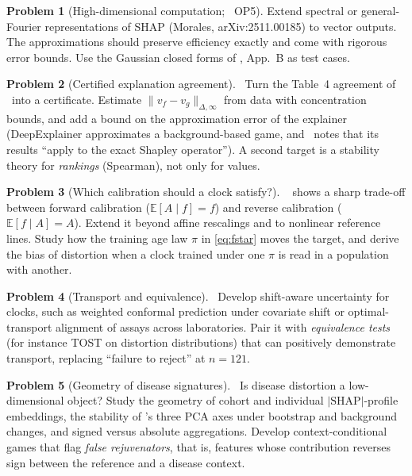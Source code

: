 \documentclass[11pt,a4paper]{article}
\theoremstyle{plain}
\theoremstyle{definition}
\newtheorem{problem}{Problem}
\theoremstyle{remark}
\newcommand{\tagbox}[2]{\tcbox[on line,boxsep=1pt,left=2pt,right=2pt,top=0pt,bottom=0pt,
  colback=#1!12!white,colframe=#1,boxrule=0.4pt,arc=1pt]{\scriptsize\bfseries\color{#1}#2}}
\newcommand{\PROP}{\tagbox{ochre}{PROPOSAL}}
\newcommand{\E}{\mathbb{E}}
\begin{document}
\begin{problem}[High-dimensional computation; \PII\ OP5]\label{prob:highdim}
Extend spectral or general-Fourier representations of SHAP (Morales, arXiv:2511.00185) to vector outputs. The approximations should preserve efficiency exactly and come with rigorous error bounds. Use the Gaussian closed forms of \PII, App.~B as test cases.
\end{problem}

\begin{problem}[Certified explanation agreement]\label{prob:certificate}
\PROP\ Turn the Table~4 agreement of \PII\ into a certificate. Estimate $\|v_f-v_g\|_{\Delta,\infty}$ from data with concentration bounds, and add a bound on the approximation error of the explainer (DeepExplainer approximates a background-based game, and \PII\ notes that its results ``apply to the exact Shapley operator''). A second target is a stability theory for \emph{rankings} (Spearman), not only for values.
\end{problem}

\begin{problem}[Which calibration should a clock satisfy?]\label{prob:calibration}
\PROP\  shows a sharp trade-off between forward calibration ($\E[A\mid f]=f$) and reverse calibration ($\E[f\mid A]=A$). Extend it beyond affine rescalings and to nonlinear reference lines. Study how the training age law $\pi$ in \eqref{eq:fstar} moves the target, and derive the bias of distortion when a clock trained under one $\pi$ is read in a population with another.
\end{problem}

\begin{problem}[Transport and equivalence]\label{prob:transport}
\PROP\ Develop shift-aware uncertainty for clocks, such as weighted conformal prediction under covariate shift or optimal-transport alignment of assays across laboratories. Pair it with \emph{equivalence tests} (for instance TOST on distortion distributions) that can positively demonstrate transport, replacing ``failure to reject'' at $n=121$.
\end{problem}

\begin{problem}[Geometry of disease signatures]\label{prob:geometry}
\PROP\ Is disease distortion a low-dimensional object? Study the geometry of cohort and individual $|\mathrm{SHAP}|$-profile embeddings, the stability of \PI's three PCA axes under bootstrap and background changes, and signed versus absolute aggregations. Develop context-conditional games that flag \emph{false rejuvenators}, that is, features whose contribution reverses sign between the reference and a disease context.
\end{problem}
\end{document}
